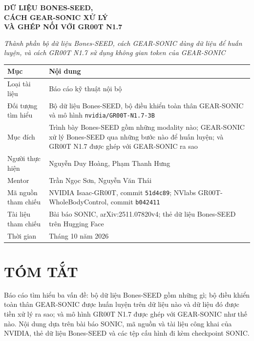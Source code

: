 \documentclass[12pt,a4paper,oneside]{report}
\newcommand{\code}[1]{\texttt{#1}}
\begin{document}
\begin{center}
\vspace*{1.5cm}
{\LARGE\bfseries\color{navy} DỮ LIỆU BONES-SEED,\\[0.2cm] CÁCH GEAR-SONIC XỬ LÝ\\[0.2cm] VÀ GHÉP NỐI VỚI GR00T N1.7\par}
\vspace{0.6cm}
{\large\itshape Thành phần bộ dữ liệu Bones-SEED, cách GEAR-SONIC dùng dữ liệu để huấn luyện, và cách GR00T N1.7 sử dụng không gian token của GEAR-SONIC\par}
\vspace{1.5cm}
\begin{tabular}{L{4.2cm}L{10.5cm}}
\toprule
\textbf{Mục} & \textbf{Nội dung}\\
\midrule
Loại tài liệu & Báo cáo kỹ thuật nội bộ\\
Đối tượng tìm hiểu & Bộ dữ liệu Bones-SEED, bộ điều khiển toàn thân GEAR-SONIC và mô hình \code{nvidia/GR00T-N1.7-3B}\\
Mục đích & Trình bày Bones-SEED gồm những modality nào; GEAR-SONIC xử lý Bones-SEED qua những bước nào để huấn luyện; và GR00T N1.7 được ghép với GEAR-SONIC ra sao\\
Người thực hiện & Nguyễn Duy Hoàng, Phạm Thanh Hưng\\
Mentor & Trần Ngọc Sơn, Nguyễn Văn Thái\\
Mã nguồn tham chiếu & NVIDIA Isaac-GR00T, commit \code{51d4c89}; NVlabs GR00T-WholeBodyControl, commit \code{b042411}\\
Tài liệu tham chiếu & Bài báo SONIC, arXiv:2511.07820v4; thẻ dữ liệu Bones-SEED trên Hugging Face\\
Thời gian & Tháng 10 năm 2026\\
\bottomrule
\end{tabular}
\end{center}
\clearpage

\chapter*{TÓM TẮT}

Báo cáo tìm hiểu ba vấn đề: bộ dữ liệu Bones-SEED gồm những gì; bộ điều khiển toàn thân GEAR-SONIC được huấn luyện trên dữ liệu nào và dữ liệu đó được tiền xử lý ra sao; và mô hình GR00T N1.7 được ghép với GEAR-SONIC như thế nào. Nội dung dựa trên bài báo SONIC, mã nguồn và tài liệu công khai của NVIDIA, thẻ dữ liệu Bones-SEED và các tệp cấu hình đi kèm checkpoint SONIC.
\end{document}
